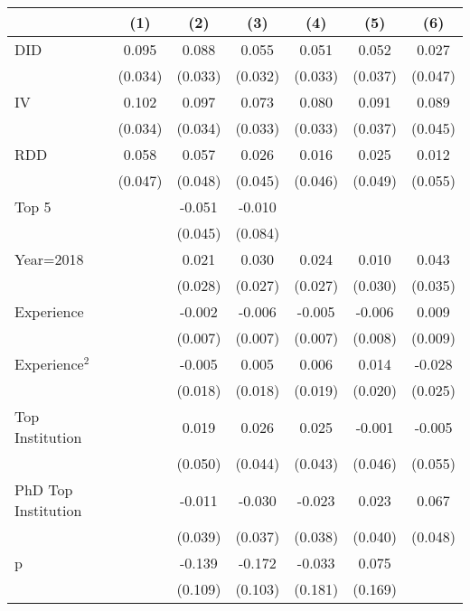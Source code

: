 \begin{tabular}{l*{6}{c}}
\hline\hline
                &\multicolumn{1}{c}{(1)}&\multicolumn{1}{c}{(2)}&\multicolumn{1}{c}{(3)}&\multicolumn{1}{c}{(4)}&\multicolumn{1}{c}{(5)}&\multicolumn{1}{c}{(6)}\\
\hline
DID             &    0.095&    0.088&    0.055&    0.051&    0.052&    0.027\\
                &  (0.034)&  (0.033)&  (0.032)&  (0.033)&  (0.037)&  (0.047)\\
IV              &    0.102&    0.097&    0.073&    0.080&    0.091&    0.089\\
                &  (0.034)&  (0.034)&  (0.033)&  (0.033)&  (0.037)&  (0.045)\\
RDD             &    0.058&    0.057&    0.026&    0.016&    0.025&    0.012\\
                &  (0.047)&  (0.048)&  (0.045)&  (0.046)&  (0.049)&  (0.055)\\
Top 5           &         &   -0.051&   -0.010&         &         &         \\
                &         &  (0.045)&  (0.084)&         &         &         \\
Year=2018       &         &    0.021&    0.030&    0.024&    0.010&    0.043\\
                &         &  (0.028)&  (0.027)&  (0.027)&  (0.030)&  (0.035)\\
Experience      &         &   -0.002&   -0.006&   -0.005&   -0.006&    0.009\\
                &         &  (0.007)&  (0.007)&  (0.007)&  (0.008)&  (0.009)\\
Experience$^2$  &         &   -0.005&    0.005&    0.006&    0.014&   -0.028\\
                &         &  (0.018)&  (0.018)&  (0.019)&  (0.020)&  (0.025)\\
Top Institution &         &    0.019&    0.026&    0.025&   -0.001&   -0.005\\
                &         &  (0.050)&  (0.044)&  (0.043)&  (0.046)&  (0.055)\\
PhD Top Institution&         &   -0.011&   -0.030&   -0.023&    0.023&    0.067\\
                &         &  (0.039)&  (0.037)&  (0.038)&  (0.040)&  (0.048)\\
p               &         &   -0.139&   -0.172&   -0.033&    0.075&         \\
                &         &  (0.109)&  (0.103)&  (0.181)&  (0.169)&         \\

\end{tabular}
